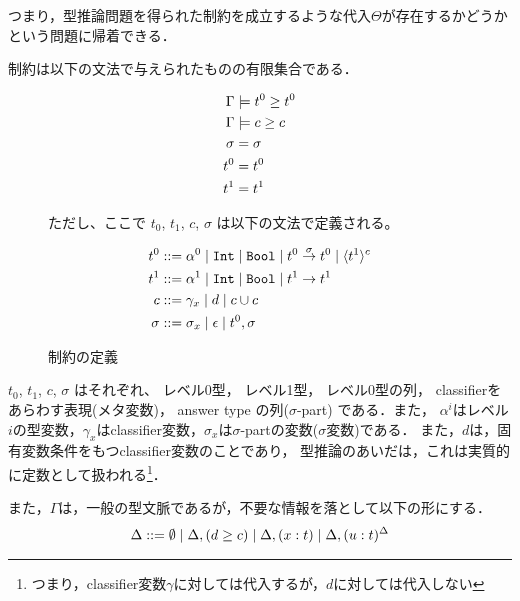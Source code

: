 つまり，型推論問題を得られた制約を成立するような代入$\Theta$が存在するかどうかという問題に帰着できる．

制約は以下の文法で与えられたものの有限集合である．

\begin{figure}[H]
  \centering
  \begin{align*}
    \Gamma &\models {t^0} \ge {t^0} \\
    \Gamma &\models {c} \ge {c} \\
    \sigma &= \sigma \\
    t^0 &= t^0 \\
    t^1 &= t^1
  \end{align*}

  ただし、ここで $t_0$, $t_1$, $c$, $\sigma$ は以下の文法で定義される。

  \begin{align*}
    t^0      & ::= \alpha^0 \mid \mbox{\texttt{Int}} \mid \mbox{\texttt{Bool}} \mid {t^0} \stackrel{\sigma}{\rightarrow} {t^0} \mid \langle{t^1}\rangle^{c} \\
    t^1      & ::= \alpha^1 \mid \mbox{\texttt{Int}} \mid \mbox{\texttt{Bool}} \mid {t^1} \stackrel{}{\rightarrow} {t^1} \\
    c        & ::= \gamma_x \mid d \mid c \cup c \\
    \sigma   & ::= \sigma_x \mid \epsilon \mid t^0, \sigma
  \end{align*}

  \caption{制約の定義}
  \label{fig:constr_def}
\end{figure}

$t_0$, $t_1$, $c$, $\sigma$ はそれぞれ、
レベル0型，
レベル1型，
レベル0型の列，
classifierをあらわす表現(メタ変数)，
answer type の列($\sigma$-part)
である．また，
$\alpha^i$はレベル$i$の型変数，$\gamma_x$はclassifier変数，$\sigma_x$は$\sigma$-partの変数($\sigma$変数)である．
また，$d$は，固有変数条件をもつclassifier変数のことであり，
型推論のあいだは，これは実質的に定数として扱われる\footnote{つまり，classifier変数$\gamma$に対しては代入するが，$d$に対しては代入しない}．

また，$\Gamma$は，一般の型文脈であるが，不要な情報を落として以下の形にする．
\begin{align*}
  \Delta ::= \emptyset
  \mid \Delta, ({d} \ge {c})
  \mid \Delta, (x : t)
  \mid \Delta, (u : t)^{\Delta}
\end{align*}


